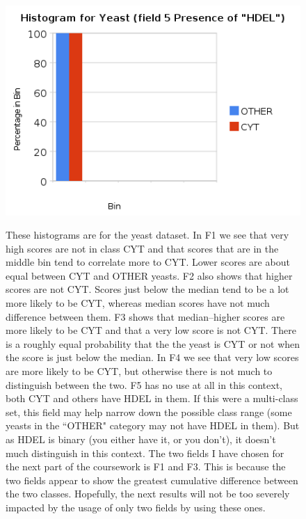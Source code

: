 \documentclass[a4paper,10pt]{article}
\begin{document}
        \begin{figure}[ht!]
          \begin{minipage}[t]{0.5\linewidth}
              \includegraphics[scale=0.45]{charts/YeastPics/Y5.png}
          \end{minipage}
          \parbox[b]{3.5in}{
            These histograms are for the yeast dataset. In F1 we see that very high scores are not in class CYT
            and that scores that are in the middle bin tend to correlate more to CYT. Lower scores are about equal
            between CYT and OTHER yeasts.
            F2 also shows that higher scores are not CYT. Scores just below the median tend to be a lot more likely to 
            be CYT, whereas median scores have not much difference between them.
            F3 shows that median--higher scores are more likely to be CYT and that a very low score is not CYT. There is
            a roughly equal probability that the the yeast is CYT or not when the score is just below the median.
            In F4 we see that very low scores are more likely to be CYT, but otherwise there is not much to distinguish
            between the two.
            F5 has no use at all in this context, both CYT and others have HDEL in them. If this were a multi-class set,
            this field may help narrow down the possible class range (some yeasts in the ``OTHER" category may not have
            HDEL in them). But as HDEL is binary (you either have it, or you don't), it doesn't much distinguish in this
            context.
            The two fields I have chosen for the next part of the coursework is F1 and F3. This is because the two fields
            appear to show the greatest cumulative difference between the two classes. Hopefully, the next results will
            not be too severely impacted by the usage of only two fields by using these ones.    
          }
        \end{figure}
 
\end{document}
